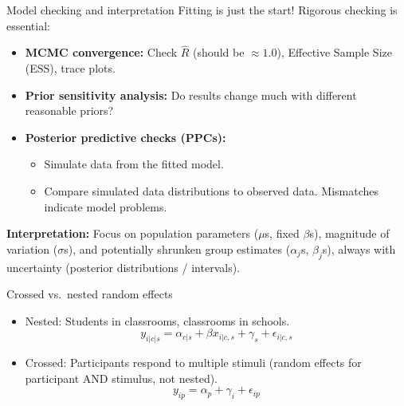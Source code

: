\documentclass[aspectratio=169]{beamer}
\begin{document}
\begin{frame}[fragile]{Model checking and interpretation}
    Fitting is just the start! Rigorous checking is essential:
    \pause
    \begin{itemize}
        \item \textbf{MCMC convergence:} Check $\hat{R}$ (should be $\approx 1.0$), Effective Sample Size (ESS), trace plots.
        \pause
        \item \textbf{Prior sensitivity analysis:} Do results change much with different reasonable priors?
        \pause
        \item \textbf{Posterior predictive checks (PPCs):}
        \begin{itemize}
            \item Simulate data from the fitted model.
            \item Compare simulated data distributions to observed data. Mismatches indicate model problems.
        \end{itemize}
    \end{itemize}
    \pause
    \vfill
    \textbf{Interpretation:} Focus on population parameters ($\mu$s, fixed $\beta$s), magnitude of variation ($\sigma$s), and potentially shrunken group estimates ($\alpha_j$s, $\beta_j$s), always with uncertainty (posterior distributions / intervals).
\end{frame}

\begin{frame}[fragile]{Crossed vs.\ nested random effects}
    \begin{itemize}
        \item Nested: Students in classrooms, classrooms in schools.
        $$y_{i|c|s} = \alpha_{c|s} + \beta x_{i|c,s} + \gamma_{s} + \epsilon_{i|c,s}$$
        \item Crossed: Participants respond to multiple stimuli (random effects for participant AND stimulus, not nested).
        $$y_{ip} = \alpha_{p} + \gamma_{i} + \epsilon_{ip}$$
    \end{itemize}
\end{frame}
\end{document}
